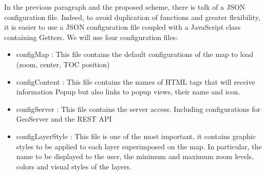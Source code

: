 


In the previous paragraph and the proposed scheme, there is talk of a JSON configuration file. Indeed, to avoid duplication of functions and greater flexibility, it is easier to use a JSON configuration file coupled with a JavaScript class containing Getters. We will use four configuration files:

\begin{itemize}
  \item configMap : This file contains the default configurations of the map to load (zoom, center, TOC position)
  \item configContent : This file contains the names of HTML tags that will receive information Popup but also links to popup views, their name and icon.
  \item configServer : This file contains the server access. Including configurations for GeoServer and the REST API
  \item configLayerStyle : This file is one of the most important, it contains graphic styles to be applied to each layer superimposed on the map. In particular, the name to be displayed to the user, the minimum and maximum zoom levels, colors and visual styles of the layers.
\end{itemize}

